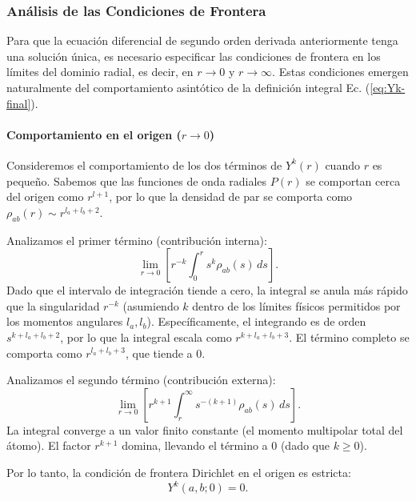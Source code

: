 \subsubsection{Análisis de las Condiciones de Frontera}

Para que la ecuación diferencial de segundo orden derivada anteriormente tenga una solución única, es necesario especificar las condiciones de frontera en los límites del dominio radial, es decir, en $r \to 0$ y $r \to \infty$. Estas condiciones emergen naturalmente del comportamiento asintótico de la definición integral Ec. (\cref{eq:Yk-final}).

\paragraph{Comportamiento en el origen ($r \to 0$)}

Consideremos el comportamiento de los dos términos de $Y^k(r)$ cuando $r$ es pequeño. Sabemos que las funciones de onda radiales $P(r)$ se comportan cerca del origen como $r^{l+1}$, por lo que la densidad de par se comporta como $\rho_{ab}(r) \sim r^{l_a + l_b + 2}$.

Analizamos el primer término (contribución interna):
\begin{equation}
    \lim_{r \to 0} \left[ r^{-k} \int_0^r s^k \rho_{ab}(s) \, ds \right].
\end{equation}
Dado que el intervalo de integración tiende a cero, la integral se anula más rápido que la singularidad $r^{-k}$ (asumiendo $k$ dentro de los límites físicos permitidos por los momentos angulares $l_a, l_b$). Específicamente, el integrando es de orden $s^{k + l_a + l_b + 2}$, por lo que la integral escala como $r^{k + l_a + l_b + 3}$. El término completo se comporta como $r^{l_a + l_b + 3}$, que tiende a 0.

Analizamos el segundo término (contribución externa):
\begin{equation}
    \lim_{r \to 0} \left[ r^{k+1} \int_r^{\infty} s^{-(k+1)} \rho_{ab}(s) \, ds \right].
\end{equation}
La integral converge a un valor finito constante (el momento multipolar total del átomo). El factor $r^{k+1}$ domina, llevando el término a 0 (dado que $k \geq 0$).

Por lo tanto, la condición de frontera Dirichlet en el origen es estricta:
\begin{equation}
\label{eq:bc-origin}
    Y^k(a,b; 0) = 0.
\end{equation}


